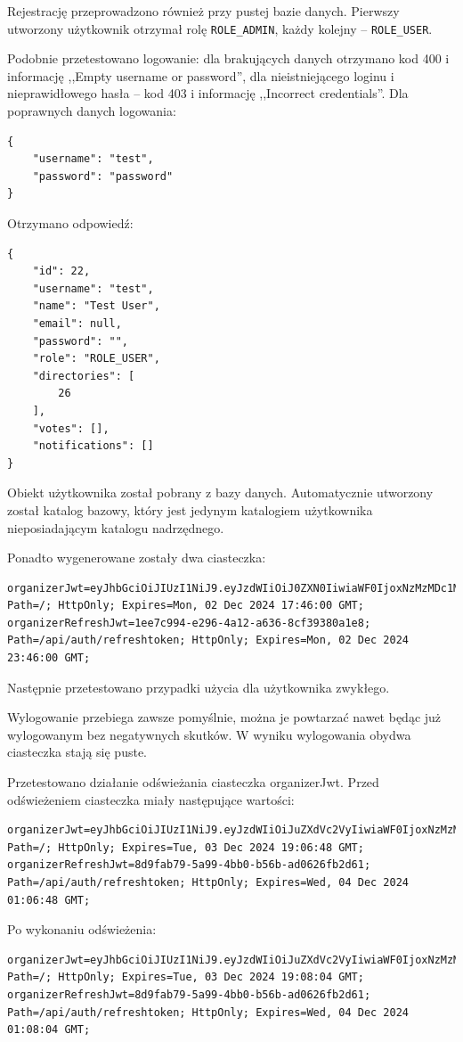 \documentclass[a4paper,twoside,12pt]{book}
\begin{document}
Rejestrację przeprowadzono również przy pustej bazie danych. Pierwszy utworzony użytkownik otrzymał rolę \texttt{ROLE_ADMIN}, każdy kolejny -- \texttt{ROLE_USER}.

Podobnie przetestowano logowanie: dla brakujących danych otrzymano kod 400 i informację ,,Empty username or password'', dla nieistniejącego loginu i nieprawidłowego hasła -- kod 403 i informację ,,Incorrect credentials''. Dla poprawnych danych logowania:
\begin{verbatim}
{
	"username": "test",
	"password": "password"
}
\end{verbatim}
Otrzymano odpowiedź:
\begin{verbatim}
{
	"id": 22,
	"username": "test",
	"name": "Test User",
	"email": null,
	"password": "",
	"role": "ROLE_USER",
	"directories": [
		26
	],
	"votes": [],
	"notifications": []
}
\end{verbatim}
Obiekt użytkownika został pobrany z bazy danych. Automatycznie utworzony został katalog bazowy, który jest jedynym katalogiem użytkownika nieposiadającym katalogu nadrzędnego.

Ponadto wygenerowane zostały dwa ciasteczka:
\begin{verbatim}
organizerJwt=eyJhbGciOiJIUzI1NiJ9.eyJzdWIiOiJ0ZXN0IiwiaWF0IjoxNzMzMDc1MTYxLCJleHAiOjE3MzMxNjE1NjF9.UOpUtCw0G1TgcEf9ufIk2T00JqQ8ARo61cZJnYslPdU; Path=/; HttpOnly; Expires=Mon, 02 Dec 2024 17:46:00 GMT;
organizerRefreshJwt=1ee7c994-e296-4a12-a636-8cf39380a1e8; Path=/api/auth/refreshtoken; HttpOnly; Expires=Mon, 02 Dec 2024 23:46:00 GMT;
\end{verbatim}

Następnie przetestowano przypadki użycia dla użytkownika zwykłego.

Wylogowanie przebiega zawsze pomyślnie, można je powtarzać nawet będąc już wylogowanym bez negatywnych skutków. W wyniku wylogowania obydwa ciasteczka stają się puste.

Przetestowano działanie odświeżania ciasteczka organizerJwt. Przed odświeżeniem ciasteczka miały następujące wartości:
\begin{verbatim}
organizerJwt=eyJhbGciOiJIUzI1NiJ9.eyJzdWIiOiJuZXdVc2VyIiwiaWF0IjoxNzMzMTY2NDA4LCJleHAiOjE3MzMyNTI4MDh9._JyoQNrhYdpdl3EPM8NFg29c0HwLm5nMidQ8Fh4Wsik; Path=/; HttpOnly; Expires=Tue, 03 Dec 2024 19:06:48 GMT;
organizerRefreshJwt=8d9fab79-5a99-4bb0-b56b-ad0626fb2d61; Path=/api/auth/refreshtoken; HttpOnly; Expires=Wed, 04 Dec 2024 01:06:48 GMT;
\end{verbatim}
Po wykonaniu odświeżenia:
\begin{verbatim}
organizerJwt=eyJhbGciOiJIUzI1NiJ9.eyJzdWIiOiJuZXdVc2VyIiwiaWF0IjoxNzMzMTY2NDg0LCJleHAiOjE3MzMyNTI4ODR9.ekR8DYMFlny3pKLKaunjOtXXTE3qH8dTfEFGYdaSpNs; Path=/; HttpOnly; Expires=Tue, 03 Dec 2024 19:08:04 GMT;
organizerRefreshJwt=8d9fab79-5a99-4bb0-b56b-ad0626fb2d61; Path=/api/auth/refreshtoken; HttpOnly; Expires=Wed, 04 Dec 2024 01:08:04 GMT;
\end{verbatim}
\end{document}
